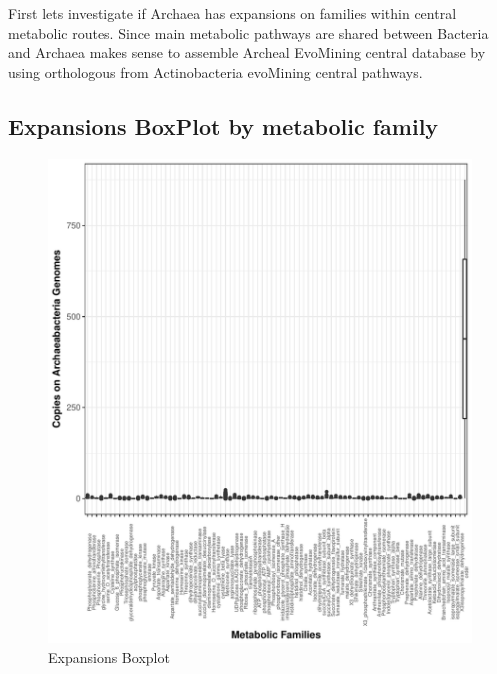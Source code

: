 \documentclass[12pt,twoside]{reedthesis}
\begin{document}
  First lets investigate if Archaea has expansions on families within
  central metabolic routes. Since main metabolic pathways are shared
  between Bacteria and Archaea makes sense to assemble Archeal EvoMining
  central database by using orthologous from Actinobacteria evoMining
  central pathways.
  
  \subsection{Expansions BoxPlot by metabolic
  family}\label{expansions-boxplot-by-metabolic-family}
  
  \begin{Shaded}
  \begin{Highlighting}[]
  \NormalTok{(} \NormalTok{, } \NormalTok{,} \NormalTok{, } \NormalTok{,}\NormalTok{)}
  \end{Highlighting}
  \end{Shaded}
  
  \begin{figure}[h!tbp]
  \centering
  \includegraphics[angle = 0,scale = .7]{chapter3/expansion_plotArchaeas.pdf}
  \caption[Expansions Boxplot]{\normalsize{Expansions Boxplot}}
  \label{fig:Archaea_expansion_boxplot}
  \end{figure}
  
\end{document}

